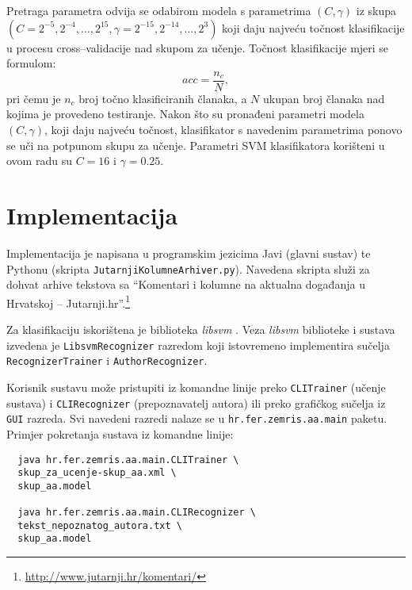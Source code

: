 \documentclass{article}
\begin{document}
Pretraga parametra odvija se odabirom modela s parametrima $(C, \gamma)$ iz skupa
$\left (C = {2^{-5}, 2^{-4}, \ldots , 2^{15}},  \gamma = {2^{-15}, 2^{-14},
\ldots, 2^3} \right )$ \citep{CC01a} koji daju najveću točnost klasifikacije u
procesu cross--validacije nad skupom za učenje. Točnost klasifikacije mjeri se formulom:
\begin{equation}
acc = \frac{n_c}{N},
\end{equation}
pri čemu je $n_c$ broj točno klasificiranih članaka, a $N$ ukupan broj članaka
nad kojima je provedeno testiranje. Nakon što su pronađeni parametri modela $(C,
\gamma)$, koji daju najveću točnost, klasifikator s navedenim parametrima ponovo
se uči na potpunom skupu za učenje. Parametri SVM klasifikatora korišteni u ovom
radu su $C = 16$ i $\gamma = 0.25$.


\section{Implementacija}
\label{sec:implementacija}
Implementacija je napisana u programskim jezicima Javi (glavni sustav) te
Pythonu (skripta \texttt{JutarnjiKolumneArhiver.py}). Navedena skripta služi za
dohvat arhive tekstova sa ``Komentari i kolumne na aktualna događanja u
Hrvatskoj -- Jutarnji.hr''.\footnote{\url{http://www.jutarnji.hr/komentari/}}


Za klasifikaciju iskorištena je biblioteka \emph{libsvm} \citep{CC01a}. Veza
\emph{libsvm} biblioteke i sustava izvedena je \texttt{LibsvmRecognizer}
razredom koji istovremeno implementira sučelja \texttt{RecognizerTrainer} i
\texttt{AuthorRecognizer}.

Korisnik sustavu može pristupiti iz komandne linije preko \texttt{CLITrainer}
(učenje sustava) i \texttt{CLIRecognizer} (prepoznavatelj autora) ili preko
grafičkog sučelja iz \texttt{GUI} razreda. Svi navedeni razredi nalaze se u
\texttt{hr.fer.zemris.aa.main} paketu. Primjer pokretanja sustava iz
komandne linije:
\begin{verbatim}
  java hr.fer.zemris.aa.main.CLITrainer \
  skup_za_ucenje-skup_aa.xml \
  skup_aa.model
  
  java hr.fer.zemris.aa.main.CLIRecognizer \
  tekst_nepoznatog_autora.txt \
  skup_aa.model
\end{verbatim}
\end{document}
